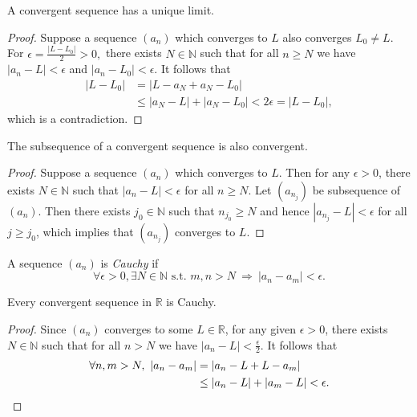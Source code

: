 
\begin{lem}
  \label{lem:seqLimitIsUnique}
  A convergent sequence has a unique limit.
\end{lem}
\begin{proof}
  Suppose a sequence $(a_{n})$ which converges to $L$
  also converges $L_{0}\neq L.$
  For $\epsilon=\frac{|L-L_{0}|}{2}>0,$ there exists $N\in \mathbb{N}$
  such that for all $n\ge N$ we have
  $|a_{n}-L|<\epsilon$ and $|a_{n}-L_{0}|<\epsilon$. It follows that
  \begin{align*}
    |L-L_{0}|&= |L-a_{N}+a_{N}-L_{0}|\\
    &\le |a_{N}-L|+|a_{N}-L_{0}|
    < 2\epsilon = |L-L_{0}|,
  \end{align*}
  which is a contradiction.
\end{proof}

\begin{lem}
  \label{lem:subsequenceInConvergentSequenceIsConvergent}
  The subsequence of a convergent sequence is also convergent.
\end{lem}
\begin{proof}
  Suppose a sequence $(a_{n})$ which converges to $L$.
  Then for any $\epsilon>0$, there exists $N\in \mathbb{N}$ such that
  $|a_{n}-L|<\epsilon$ for all $n\ge N$.
  Let $(a_{n_{j}})$ be subsequence of $(a_{n})$. Then there exists
  $j_{0}\in \mathbb{N}$ such that $n_{j_{0}}\ge N$ and hence
  $|a_{n_{j}}-L|<\epsilon$ for all $j\ge j_{0}$, which implies that
  $(a_{n_{j}})$ converges to $L$.
\end{proof}

\begin{defn}
  \label{def:CauchySequence}
  A sequence $(a_n)$ is \emph{Cauchy} if
  \begin{equation}
    \label{eq:CauchySequence}
    \forall \epsilon>0, \exists N\in \mathbb{N}
    \text{ s.t. } m,n>N\ \Rightarrow\ |a_n-a_m| < \epsilon.
  \end{equation}
\end{defn}

\begin{lem}
  \label{lem:convergentSeqIsCauchy}
  Every convergent sequence in $\mathbb{R}$
  is Cauchy.
\end{lem}
\begin{proof}
  Since $(a_n)$ converges to some $L\in \mathbb{R}$,
  for any given $\epsilon>0$,
  there exists $N\in \mathbb{N}$ such that
  for all $n>N$ we have $|a_n-L|<\frac{\epsilon}{2}$.
  It follows that
  \begin{align*}
    \forall n,m>N,\  |a_n-a_m|
    &= |a_n-L+L-a_m|
    \\
    &\le |a_n-L| + |a_m-L| < \epsilon.\qedhere
  \end{align*}
\end{proof}


